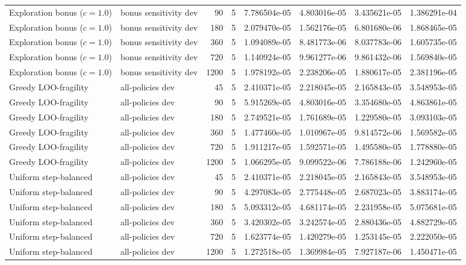 \begin{scriptsize}
\begin{longtable}{llrrrrrr}
Exploration bonus ($c=1.0$) & bonus sensitivity dev & 90 & 5 & 7.786504e-05 & 4.803016e-05 & 3.435621e-05 & 1.386291e-04 \\
Exploration bonus ($c=1.0$) & bonus sensitivity dev & 180 & 5 & 2.079470e-05 & 1.562176e-05 & 6.801680e-06 & 1.868465e-05 \\
Exploration bonus ($c=1.0$) & bonus sensitivity dev & 360 & 5 & 1.094089e-05 & 8.481773e-06 & 8.037783e-06 & 1.605735e-05 \\
Exploration bonus ($c=1.0$) & bonus sensitivity dev & 720 & 5 & 1.140924e-05 & 9.961277e-06 & 9.861432e-06 & 1.569840e-05 \\
Exploration bonus ($c=1.0$) & bonus sensitivity dev & 1200 & 5 & 1.978192e-05 & 2.238206e-05 & 1.880617e-05 & 2.381196e-05 \\
Greedy LOO-fragility & all-policies dev & 45 & 5 & 2.410371e-05 & 2.218045e-05 & 2.165843e-05 & 3.548953e-05 \\
Greedy LOO-fragility & all-policies dev & 90 & 5 & 5.915269e-05 & 4.803016e-05 & 3.354680e-05 & 4.863861e-05 \\
Greedy LOO-fragility & all-policies dev & 180 & 5 & 2.749521e-05 & 1.761689e-05 & 1.229580e-05 & 3.093103e-05 \\
Greedy LOO-fragility & all-policies dev & 360 & 5 & 1.477460e-05 & 1.010967e-05 & 9.814572e-06 & 1.569582e-05 \\
Greedy LOO-fragility & all-policies dev & 720 & 5 & 1.911217e-05 & 1.592571e-05 & 1.495580e-05 & 1.778880e-05 \\
Greedy LOO-fragility & all-policies dev & 1200 & 5 & 1.066295e-05 & 9.099522e-06 & 7.786188e-06 & 1.242960e-05 \\
Uniform step-balanced & all-policies dev & 45 & 5 & 2.410371e-05 & 2.218045e-05 & 2.165843e-05 & 3.548953e-05 \\
Uniform step-balanced & all-policies dev & 90 & 5 & 4.297083e-05 & 2.775448e-05 & 2.687023e-05 & 3.883174e-05 \\
Uniform step-balanced & all-policies dev & 180 & 5 & 5.093312e-05 & 4.681174e-05 & 2.231958e-05 & 5.075681e-05 \\
Uniform step-balanced & all-policies dev & 360 & 5 & 3.420302e-05 & 3.242574e-05 & 2.880436e-05 & 4.882729e-05 \\
Uniform step-balanced & all-policies dev & 720 & 5 & 1.623774e-05 & 1.420279e-05 & 1.253145e-05 & 2.222050e-05 \\
Uniform step-balanced & all-policies dev & 1200 & 5 & 1.272518e-05 & 1.369984e-05 & 7.927187e-06 & 1.450471e-05 \\
\bottomrule
\end{longtable}
\end{scriptsize}

